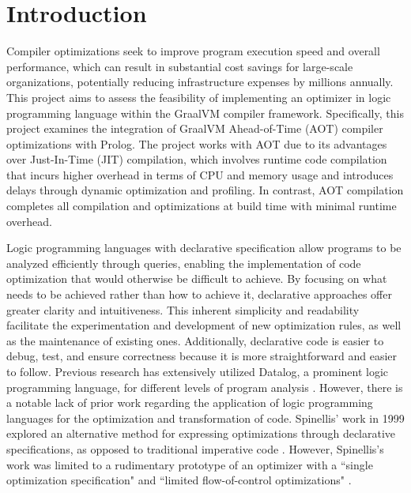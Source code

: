 \chapter[Introduction]{Introduction}

Compiler optimizations seek to improve program execution speed and overall performance, which can result in substantial cost savings for large-scale organizations, potentially reducing infrastructure expenses by millions annually. This project aims to assess the feasibility of implementing an optimizer in logic programming language within the GraalVM compiler framework. Specifically, this project examines the integration of GraalVM Ahead-of-Time (AOT) compiler optimizations with Prolog. The project works with AOT due to its advantages over Just-In-Time (JIT) compilation, which involves runtime code compilation that incurs higher overhead in terms of CPU and memory usage and introduces delays through dynamic optimization and profiling. In contrast, AOT compilation completes all compilation and optimizations at build time with minimal runtime overhead. 

Logic programming languages with declarative specification allow programs to be analyzed efficiently through queries, enabling the implementation of code optimization that would otherwise be difficult to achieve. By focusing on what needs to be achieved rather than how to achieve it, declarative approaches offer greater clarity and intuitiveness. This inherent simplicity and readability facilitate the experimentation and development of new optimization rules, as well as the maintenance of existing ones. Additionally, declarative code is easier to debug, test, and ensure correctness because it is more straightforward and easier to follow. Previous research has extensively utilized Datalog, a prominent logic programming language, for different levels of program analysis \cite{Bravenboer2009,Tonder2021,Lam2005,Benton2007}. However, there is a notable lack of prior work regarding the application of logic programming languages for the optimization and transformation of code. Spinellis’ work in 1999 explored an alternative method for expressing optimizations through declarative specifications, as opposed to traditional imperative code \cite{Spinellis1999}. However, Spinellis's work was limited to a rudimentary prototype of an optimizer with a ``single optimization specification" and ``limited flow-of-control optimizations" \cite{Spinellis1999}.

